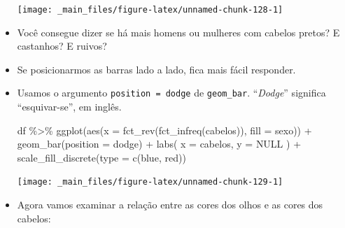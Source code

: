 \documentclass[
  11pt]{report}
\newenvironment{Shaded}{\begin{snugshade}}{\end{snugshade}}
\newcommand{\AttributeTok}[1]{\textcolor[rgb]{0.77,0.63,0.00}{#1}}
\newcommand{\ConstantTok}[1]{\textcolor[rgb]{0.00,0.00,0.00}{#1}}
\newcommand{\FunctionTok}[1]{\textcolor[rgb]{0.00,0.00,0.00}{#1}}
\newcommand{\NormalTok}[1]{#1}
\newcommand{\SpecialCharTok}[1]{\textcolor[rgb]{0.00,0.00,0.00}{#1}}
\newcommand{\StringTok}[1]{\textcolor[rgb]{0.31,0.60,0.02}{#1}}
\renewenvironment{Shaded}{
    \begin{mdframed}[%
      roundcorner=2pt,%
      innerleftmargin=5pt,%
      innerrightmargin=5pt,%
      topline=true,%
      leftline=true,%
      rightline=true,%
      bottomline=true,%
      linewidth=0.5pt,%
      linecolor=black!20,%
      backgroundcolor=black!2,%
      skipabove=2ex,%
      skipbelow=2.5ex%
    ]%
  }
  {
    \end{mdframed}
  }
\begin{document}
\begin{itemize}
  \begin{center}\texttt{[image: \_main\_files/figure-latex/unnamed-chunk-128-1]} \end{center}
\item
  Você consegue dizer se há mais homens ou mulheres com cabelos pretos? E castanhos? E ruivos?
\item
  Se posicionarmos as barras lado a lado, fica mais fácil responder.
\item
  Usamos o argumento \texttt{position\ =\ \textquotesingle{}dodge\textquotesingle{}} de \texttt{geom\_bar}. ``\emph{Dodge}'' significa ``esquivar-se'', em inglês.

\begin{Shaded}
\begin{Highlighting}[]
\NormalTok{df }\SpecialCharTok{\%\textgreater{}\%} 
  \FunctionTok{ggplot}\NormalTok{(}\FunctionTok{aes}\NormalTok{(}\AttributeTok{x =} \FunctionTok{fct\_rev}\NormalTok{(}\FunctionTok{fct\_infreq}\NormalTok{(cabelos)), }\AttributeTok{fill =}\NormalTok{ sexo)) }\SpecialCharTok{+}
    \FunctionTok{geom\_bar}\NormalTok{(}\AttributeTok{position =} \StringTok{\textquotesingle{}dodge\textquotesingle{}}\NormalTok{) }\SpecialCharTok{+}
    \FunctionTok{labs}\NormalTok{(}
      \AttributeTok{x =} \StringTok{\textquotesingle{}cabelos\textquotesingle{}}\NormalTok{,}
      \AttributeTok{y =} \ConstantTok{NULL}
\NormalTok{    ) }\SpecialCharTok{+}
    \FunctionTok{scale\_fill\_discrete}\NormalTok{(}\AttributeTok{type =} \FunctionTok{c}\NormalTok{(}\StringTok{\textquotesingle{}blue\textquotesingle{}}\NormalTok{, }\StringTok{\textquotesingle{}red\textquotesingle{}}\NormalTok{))}
\end{Highlighting}
\end{Shaded}

  \begin{center}\texttt{[image: \_main\_files/figure-latex/unnamed-chunk-129-1]} \end{center}
\item
  Agora vamos examinar a relação entre as cores dos olhos e as cores dos cabelos:


\end{itemize}
\end{document}
